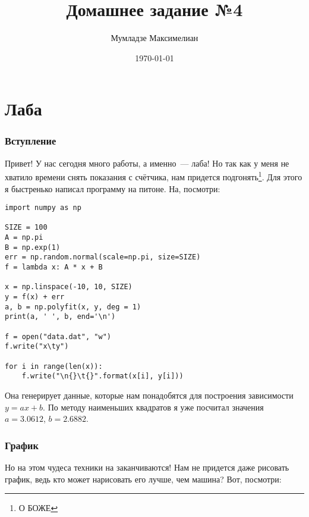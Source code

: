 \documentclass[12pt]{article}
\author{Мумладзе Максимелиан}
\title{Домашнее задание №4}
\date{\today}
\theoremstyle{definition}\newtheorem{defi}{Определение}
\begin{document}
\maketitle\thispagestyle{fancy}

\part{Лаба}

\section{Вступление}

\hspace{1pc} Привет! У нас сегодня много работы, а именно~--- лаба! Но так как у меня не хватило времени снять показания с счётчика, нам придется подгонять\footnote{О БОЖЕ}. Для этого я быстренько написал программу на питоне. На, посмотри:

\begin{lstlisting}
import numpy as np

SIZE = 100
A = np.pi
B = np.exp(1)
err = np.random.normal(scale=np.pi, size=SIZE)
f = lambda x: A * x + B

x = np.linspace(-10, 10, SIZE)
y = f(x) + err
a, b = np.polyfit(x, y, deg = 1)
print(a, ' ', b, end='\n')
    
f = open("data.dat", "w")
f.write("x\ty")

for i in range(len(x)):
	f.write("\n{}\t{}".format(x[i], y[i]))
\end{lstlisting}

Она генерирует данные, которые нам понадобятся для построения зависимости $y = ax + b$. По методу наименьших квадратов я уже посчитал значения $a = 3.0612$, $b = 2.6882$.

\newpage\section{График}
Но на этом чудеса техники на заканчиваются! Нам не придется даже рисовать график, ведь кто может нарисовать его лучше, чем машина? Вот, посмотри:



\centering
{}
\end{document}
